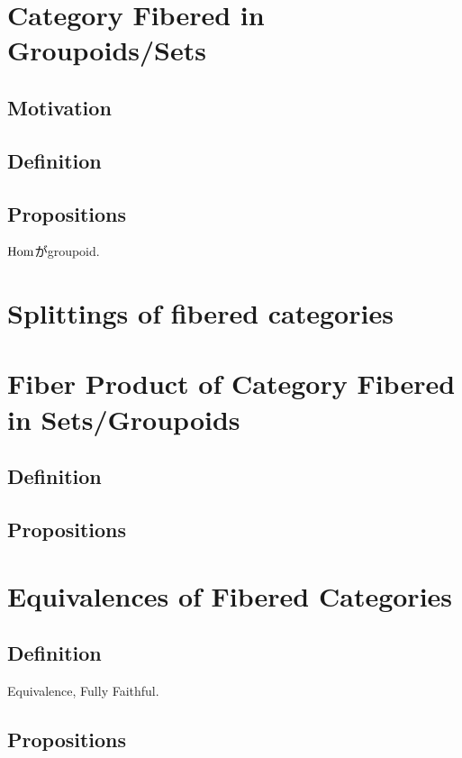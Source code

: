 \documentclass[a4paper]{jsarticle}
\begin{document}
\section{Category Fibered in Groupoids/Sets}
\subsection{Motivation}

\subsection{Definition}
    \begin{Def}
    \end{Def}

    \begin{Def}
    \end{Def}

\subsection{Propositions}
    \begin{Prop}
        $\operatorname{Hom}$がgroupoid.
    \end{Prop}

    \begin{Thm}
    \end{Thm}

\section{Splittings of fibered categories}
    \begin{Def}
        
    \end{Def}

\section{Fiber Product of Category Fibered in Sets/Groupoids}
\subsection{Definition}

\subsection{Propositions}

\section{Equivalences of Fibered Categories}
\subsection{Definition}
    Equivalence, Fully Faithful.

\subsection{Propositions}



\end{document}
